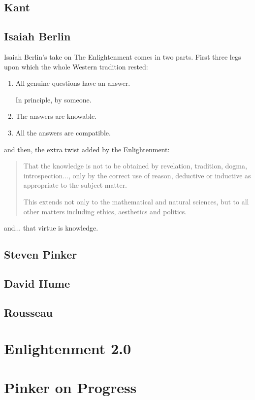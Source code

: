 \documentclass[10pt,titlepage]{article}
\begin{document}
\subsection{Kant}

\subsection{Isaiah Berlin}

Isaiah Berlin's take on The Enlightenment comes in two parts.
First three legs upon which the whole Western tradition rested:
\begin{enumerate}
  \item All genuine questions have an answer.

    In principle, by someone.
\item  The answers are knowable.
\item All the answers are compatible.
\end{enumerate}

and then, the extra twist added by the Enlightenment:
\begin{quotation}
That the knowledge is not to be obtained by revelation, tradition, dogma, introspection..., only by the correct use of reason, deductive or inductive as appropriate to the subject matter.

This extends not only to the mathematical and natural sciences, but to all other matters including ethics, aesthetics and politics.
\end{quotation}
and... that virtue is knowledge.


\subsection{Steven Pinker}

\subsection{David Hume}

\subsection{Rousseau}

\section{Enlightenment 2.0}

\appendix

\section{Pinker on Progress}
\end{document}
